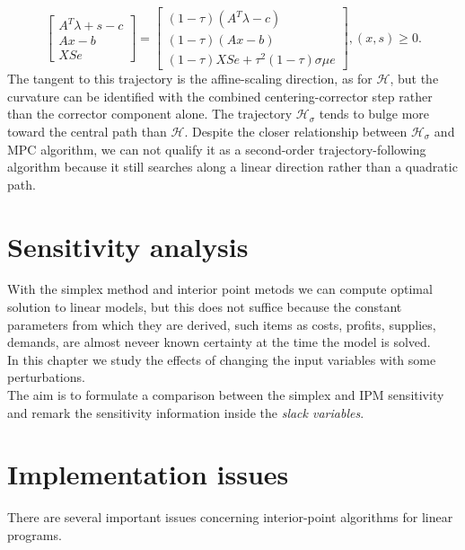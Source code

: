 \documentclass[a4paper,10 pt,titlepage,twoside]{book}
\theoremstyle{plain}
\theoremstyle{definition}
\theoremstyle{remark}
\begin{document}
\begin{equation}\label{T}
\begin{bmatrix}
A^{T}\lambda+s-c \\Ax-b \\XSe
\end{bmatrix}=\begin{bmatrix}
(1-\tau)(A^{T}\lambda-c)\\(1-\tau)(Ax-b)\\(1-\tau)XSe+\tau^{2}(1-\tau)\sigma\mu e
\end{bmatrix},(x,s)\geq0.
\end{equation}
The tangent to this trajectory is the affine-scaling direction, as for $\mathcal{H}$, but the curvature can be identified with the combined centering-corrector step rather than the corrector component alone. The trajectory $\mathcal{H}_{\sigma}$ tends to bulge more toward the central path than $\mathcal{H}$. Despite the closer relationship between $\mathcal{H}_{\sigma}$  and MPC algorithm, we can not qualify it as a second-order trajectory-following algorithm because it still searches along a linear direction rather than a quadratic path.  

\chapter{Sensitivity analysis}
With the simplex method and interior point metods we can compute optimal solution to linear models, but this does not suffice because the constant parameters from which they are derived, such items as costs, profits, supplies, demands, are almost neveer known certainty at the time the model is solved.\\
In this chapter we study the effects of changing the input variables with some perturbations.\\ The aim is to formulate a comparison between the simplex and IPM sensitivity and remark the sensitivity information inside the \textit{slack variables}.
\chapter{Implementation issues}
There are several important issues concerning interior-point algorithms
for linear programs.\\
\end{document}

